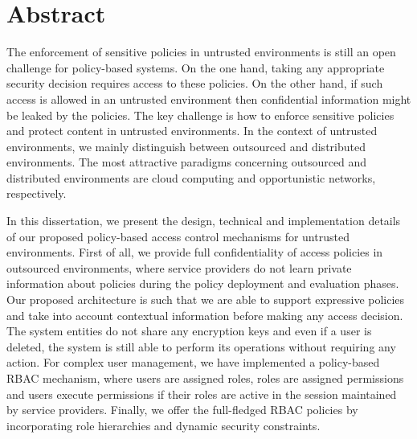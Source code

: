\documentclass[epsfig,a4paper,11pt,titlepage]{book}
\newcommand{\clearemptydoublepage}{\newpage{\pagestyle{empty}\cleardoublepage}}
\numberwithin{algorithm}{chapter}
\begin{document}
\newpage
\clearemptydoublepage
\thispagestyle{empty}
\large


\chapter*{Abstract}

\iffalse
\emph{
  The abstract goes here.  The abstract should be selfcontained
  and:
  1. clearly state the problem dealt with by the thesis
  2. give a synthetic description of the proposed solution
  3. highlight the sense in which the proposed solution enhances the
  state-of-the-art.
  The abstract must be limited to max. one page with no bibliographic
  references, nor external references on any kind.
}  
\fi 

The enforcement of sensitive policies in untrusted environments is still an open challenge for policy-based systems. On the one hand, taking any appropriate security decision requires access to these policies. On the other hand, if such access is allowed in an untrusted environment then confidential information might be leaked by the policies. The key challenge is how to enforce sensitive policies and protect content in untrusted environments. In the context of untrusted environments, we mainly distinguish between outsourced and distributed environments. The most attractive paradigms concerning outsourced and distributed environments are cloud computing and opportunistic networks, respectively.

In this dissertation, we present the design, technical and implementation details of our proposed policy-based access control mechanisms for untrusted environments. First of all, we provide full confidentiality of access policies in outsourced environments, where service providers do not learn private information about policies during the policy deployment and evaluation phases. Our proposed architecture is such that we are able to support expressive policies and take into account contextual information before making any access decision. The system entities do not share any encryption keys and even if a user is deleted, the system is still able to perform its operations without requiring any action.
For complex user management, we have implemented a policy-based \gls{RBAC} mechanism, where users are assigned roles, roles are assigned permissions and users execute permissions if their roles are active in the session maintained by service providers. Finally, we offer the full-fledged \gls{RBAC} policies by incorporating role hierarchies and dynamic security constraints.
\end{document}
